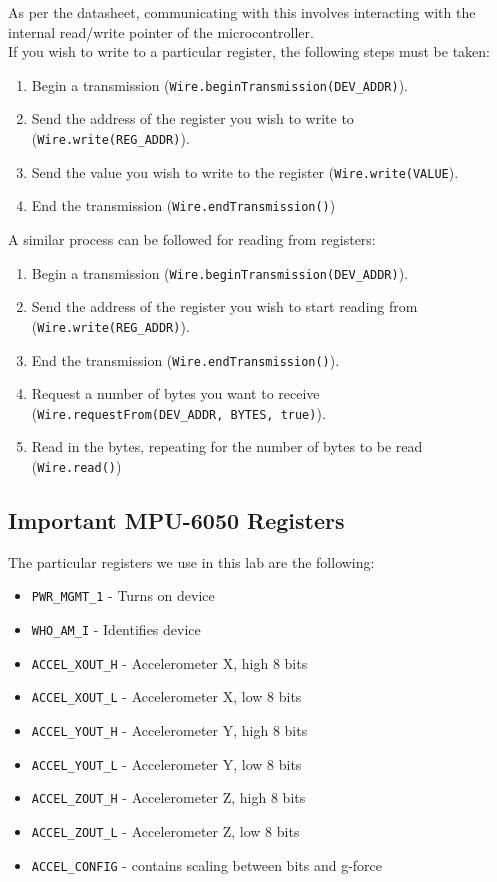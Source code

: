 \documentclass{article}
\begin{document}
        As per the datasheet, communicating with this involves interacting with the internal read/write pointer of the microcontroller. \\
        
        \noindent If you wish to write to a particular register, the following steps must be taken:
        \begin{enumerate}
            \item Begin a transmission (\texttt{Wire.beginTransmission(DEV\_ADDR)}).
            \item Send the address of the register you wish to write to (\texttt{Wire.write(REG\_ADDR)}).
            \item Send the value you wish to write to the register (\texttt{Wire.write(VALUE}).
            \item End the transmission (\texttt{Wire.endTransmission()})
        \end{enumerate}

        \noindent A similar process can be followed for reading from registers:
        \begin{enumerate}
            \item Begin a transmission (\texttt{Wire.beginTransmission(DEV\_ADDR)}).
            \item Send the address of the register you wish to start reading from (\texttt{Wire.write(REG\_ADDR)}).
            \item End the transmission (\texttt{Wire.endTransmission()}).
            \item Request a number of bytes you want to receive (\texttt{Wire.requestFrom(DEV\_ADDR, BYTES, true)}).
            \item Read in the bytes, repeating for the number of bytes to be read (\texttt{Wire.read()})
        \end{enumerate}
    \subsection{Important MPU-6050 Registers}\label{registers}
        The particular registers we use in this lab are the following: 
        \begin{itemize}
            \item \texttt{PWR\_MGMT\_1} - Turns on device
            \item \texttt{WHO\_AM\_I} - Identifies device
            \item \texttt{ACCEL\_XOUT\_H} - Accelerometer X, high 8 bits 
            \item \texttt{ACCEL\_XOUT\_L} - Accelerometer X, low 8 bits 
            \item \texttt{ACCEL\_YOUT\_H} - Accelerometer Y, high 8 bits
            \item \texttt{ACCEL\_YOUT\_L} - Accelerometer Y, low 8 bits 
            \item \texttt{ACCEL\_ZOUT\_H} - Accelerometer Z, high 8 bits
            \item \texttt{ACCEL\_ZOUT\_L} - Accelerometer Z, low 8 bits 
            \item \texttt{ACCEL\_CONFIG} - contains scaling between bits and g-force
        \end{itemize}
        
\end{document}
